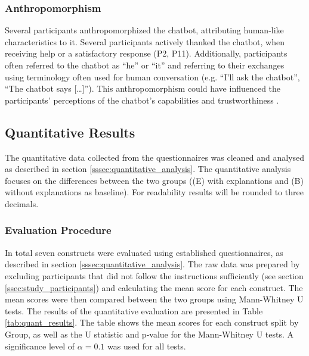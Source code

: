 \subsubsection{Anthropomorphism} \label{sssec:anthropomorphism}

Several participants anthropomorphized the chatbot, attributing human-like characteristics to it. Several participants actively thanked the chatbot, when receiving help or a satisfactory response (P2, P11). Additionally, participants often referred to the chatbot as “he” or “it” and referring to their exchanges using terminology often used for human conversation (e.g. “I'll ask the chatbot”, “The chatbot says [\dots]”). This anthropomorphism could have influenced the participants' perceptions of the chatbot's capabilities and trustworthiness \parencite{Li2022}.

\subsection{Quantitative Results} \label{ssec:quant_results}

The quantitative data collected from the questionnaires was cleaned and analysed as described in section \ref{sssec:quantitative_analysis}. The quantitative analysis focuses on the differences between the two groups ((E) with explanations and (B) without explanations as baseline).
For readability results will be rounded to three decimals.

\subsubsection{Evaluation Procedure} \label{sssec:eval_procedure}

In total seven constructs were evaluated using established questionnaires, as described in section \ref{sssec:quantitative_analysis}. The raw data was prepared by excluding participants that did not follow the instructions sufficiently (see section \ref{ssec:study_participants}) and calculating the mean score for each construct. The mean scores were then compared between the two groups using Mann-Whitney U tests. The results of the quantitative evaluation are presented in Table \ref{tab:quant_results}. The table shows the mean scores for each construct split by Group, as well as the U statistic and p-value for the Mann-Whitney U tests. A significance level of $\alpha = 0.1$ was used for all tests.

